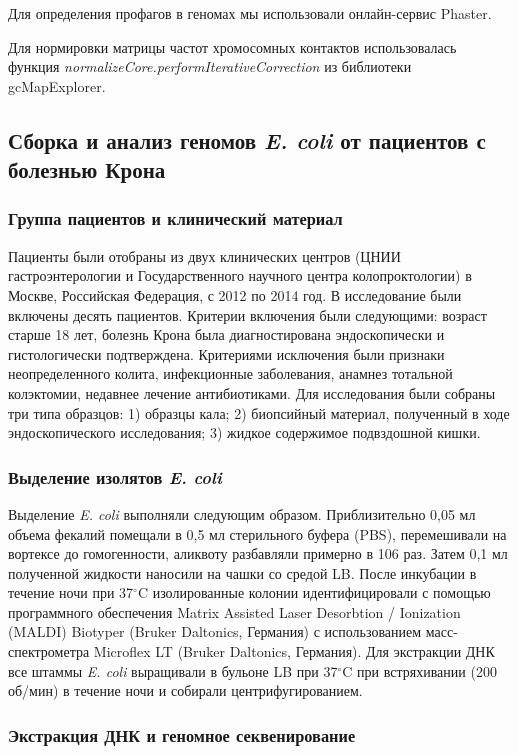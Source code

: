 Для определения профагов в геномах мы использовали онлайн-сервис Phaster. 

Для нормировки матрицы частот хромосомных контактов использовалась функция \textit{normalizeCore.performIterativeCorrection} из библиотеки gcMapExplorer. 

\subsection*{Сборка и анализ геномов \textit{E. coli} от пациентов с болезнью Крона}

\subsubsection*{Группа пациентов и клинический материал}
Пациенты были отобраны из двух клинических центров (ЦНИИ гастроэнтерологии и Государственного научного центра колопроктологии) в Москве, Российская Федерация, с 2012 по 2014 год. В исследование были включены десять пациентов. Критерии включения были следующими: возраст старше 18 лет, болезнь Крона была диагностирована эндоскопически и гистологически подтверждена. Критериями исключения были признаки неопределенного колита, инфекционные заболевания, анамнез тотальной колэктомии, недавнее лечение антибиотиками. 
Для исследования были собраны три типа образцов: 1) образцы кала; 2) биопсийный материал, полученный в ходе эндоскопического исследования; 3) жидкое содержимое подвздошной кишки.

\subsubsection*{Выделение изолятов \textit{E. coli}}

Выделение \textit{E. coli} выполняли следующим образом. Приблизительно 0,05 мл объема фекалий помещали в 0,5 мл стерильного буфера (PBS), перемешивали на вортексе до гомогенности, аликвоту разбавляли примерно в 106 раз. Затем 0,1 мл полученной жидкости наносили на чашки со средой LB. После инкубации в течение ночи при 37$^\circ$C изолированные колонии идентифицировали с помощью программного обеспечения Matrix Assisted Laser Desorbtion / Ionization (MALDI) Biotyper (Bruker Daltonics, Германия) с использованием масс-спектрометра Microflex LT (Bruker Daltonics, Германия). Для экстракции ДНК все штаммы \textit{E. coli} выращивали в бульоне LB при 37$^\circ$C при встряхивании (200 об/мин) в течение ночи и собирали центрифугированием.

\subsubsection*{Экстракция ДНК и геномное секвенирование}

